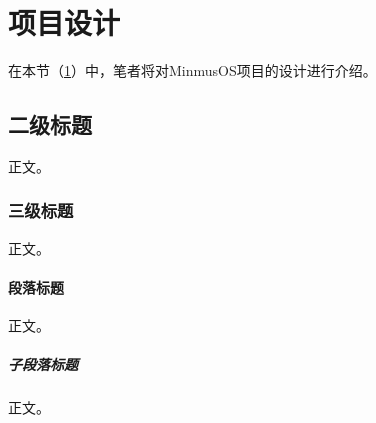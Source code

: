 \section{项目设计}\label{sec:ProjectDesign}

在本节（\cref{sec:ProjectDesign}）中，笔者将对MinmusOS项目的设计进行介绍。

\subsection{二级标题}

正文。

\subsubsection{三级标题}

正文。

\paragraph{段落标题}

正文。

\subparagraph{子段落标题}

正文。